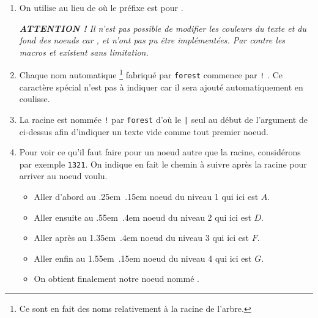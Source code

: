 \documentclass[12pt,a4paper]{article}
\begin{document}
\begin{enumerate}
	\item On utilise  au lieu de  où le préfixe  est pour .

		  \medskip
		  
		  {\itshape
		  		\textbf{ATTENTION !}
		  		Il n'est pas possible de modifier les couleurs du texte et du fond des noeuds car ,  et  n'ont pas pu être implémentées.
		  		Par contre les macros  et  existent sans limitation.
		  }

		  \medskip

	\item Chaque nom automatique
	      \footnote{
	      		Ce sont en fait des noms relativement à la racine de l'arbre.
	      }
	      fabriqué par \verb#forest# commence par \texttt{!} . Ce caractère spécial n'est pas à indiquer car il sera ajouté automatiquement en coulisse.

	
	\item La racine est nommée \texttt{!} par \verb#forest# d'où le \verb#|# seul au début de l'argument de  ci-dessus afin d'indiquer un texte vide comme tout premier noeud.

	
	\item Pour voir ce qu'il faut faire pour un noeud autre que la racine, considérons par exemple \texttt{1321}. On indique en fait le chemin à suivre après la racine pour arriver au noeud voulu.
	\begin{itemize}
		\medskip
		
		\item Aller d'abord au
		      \kern.25em\,\ier{}
		      \kern.15em
		      noeud du niveau 1 qui ici est $A$.

		\item Aller ensuite au
		      \kern.55em\,\ieme{}
		      \kern.4em
		      noeud du niveau 2 qui ici est $D$.

		\item Aller après au
		      \kern1.35em\,\ieme{}
		      \kern.4em
		      noeud du niveau 3 qui ici est $F$.
		
		\item Aller enfin au
		      \kern1.55em\,\ier{}
		      \kern.15em
		      noeud du niveau 4 qui ici est $G$.
		      
		\medskip
		
		\item On obtient finalement notre noeud nommé .
	\end{itemize}
\end{enumerate}
\end{document}
